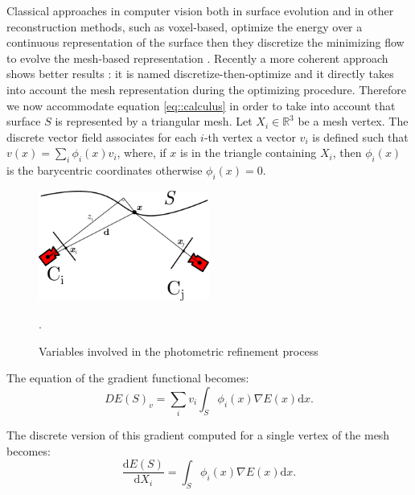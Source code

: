 Classical approaches in computer vision both in surface evolution and in other reconstruction methods, such as voxel-based, optimize the energy over a continuous representation of the surface then they discretize the minimizing flow to evolve the mesh-based representation \cite{pons2007multi,faugeras2002variational}. Recently a more coherent approach shows better results \cite{vu_et_al_2012,delaunoy_et_al_08}: it is named discretize-then-optimize and it directly takes into account the mesh representation during the optimizing procedure. 
Therefore we now accommodate equation \eqref{eq::calculus} in order to take into account that  surface $\mathit{S}$ is represented by a triangular mesh. 
Let $X_i \in \mathbb{R}^3$ be a mesh vertex. The discrete vector field associates for each $i$-th vertex a vector $v_i$ is defined such that $v(x) = \sum_i \phi_i(x) v_i$, where, if $x$ is in the triangle containing $X_i$, then $\phi_i(x)$ is the barycentric coordinates otherwise $\phi_i(x) = 0$.


\begin{figure}[t]
\centering
\includegraphics[width=0.5\textwidth]{./img/ch-incr-dens/cameproj}
\label{fig:cameraproj}
\caption{Variables involved in the photometric refinement process}.
\end{figure}

The equation of the gradient functional becomes:
\begin{equation}
  DE(\mathit{S})_v = \sum_i v_i \int_{\mathit{S}} \phi_i(x) \nabla E(x) \textrm{d}x.
\end{equation}

The discrete version of this gradient computed for a single vertex of the mesh becomes:
\begin{equation}
  \frac{\textrm{d}E(\mathit{S})}{\textrm{d}X_i} =  \int_{\mathit{S}} \phi_i(x) \nabla E(x) \textrm{d}x.
\end{equation}

